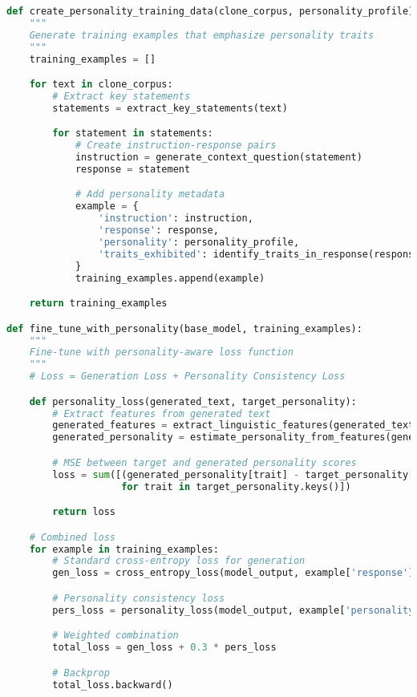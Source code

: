 \documentclass[10pt]{article}
\begin{document}
\begin{lstlisting}[language=Python]
def create_personality_training_data(clone_corpus, personality_profile):
    """
    Generate training examples that emphasize personality traits
    """
    training_examples = []

    for text in clone_corpus:
        # Extract key statements
        statements = extract_key_statements(text)

        for statement in statements:
            # Create instruction-response pairs
            instruction = generate_context_question(statement)
            response = statement

            # Add personality metadata
            example = {
                'instruction': instruction,
                'response': response,
                'personality': personality_profile,
                'traits_exhibited': identify_traits_in_response(response, personality_profile)
            }
            training_examples.append(example)

    return training_examples

def fine_tune_with_personality(base_model, training_examples):
    """
    Fine-tune with personality-aware loss function
    """
    # Loss = Generation Loss + Personality Consistency Loss

    def personality_loss(generated_text, target_personality):
        # Extract features from generated text
        generated_features = extract_linguistic_features(generated_text)
        generated_personality = estimate_personality_from_features(generated_features)

        # MSE between target and generated personality scores
        loss = sum([(generated_personality[trait] - target_personality[trait])**2
                    for trait in target_personality.keys()])

        return loss

    # Combined loss
    for example in training_examples:
        # Standard cross-entropy loss for generation
        gen_loss = cross_entropy_loss(model_output, example['response'])

        # Personality consistency loss
        pers_loss = personality_loss(model_output, example['personality'])

        # Weighted combination
        total_loss = gen_loss + 0.3 * pers_loss

        # Backprop
        total_loss.backward()
\end{lstlisting}
\end{document}
